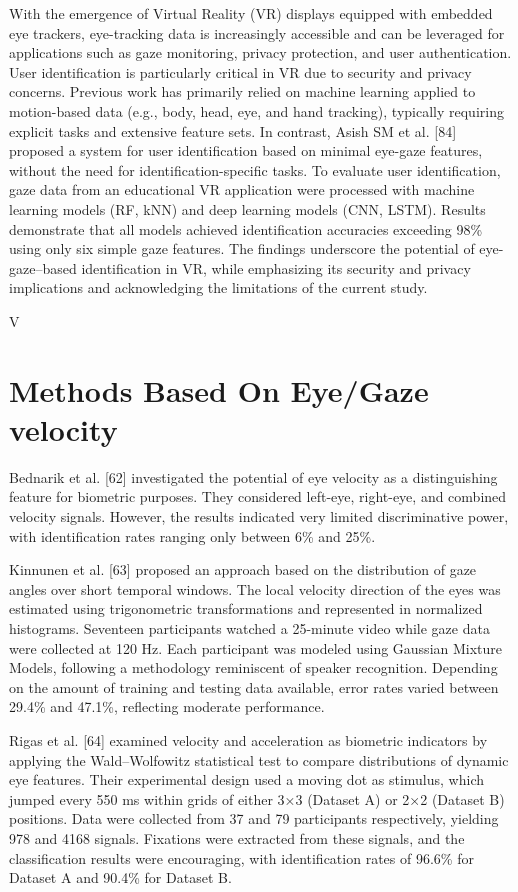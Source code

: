 \documentclass[12pt]{report}
\begin{document}
With the emergence of Virtual Reality (VR) displays equipped with embedded eye trackers, eye-tracking data is increasingly accessible and can be leveraged for applications such as gaze monitoring, privacy protection, and user authentication.
User identification is particularly critical in VR due to security and privacy concerns. 
Previous work has primarily relied on machine learning applied to motion-based data (e.g., body, head, eye, and hand tracking), typically requiring explicit tasks and extensive feature sets. 
In contrast, Asish SM et al. [84] proposed a system for user identification based on minimal eye-gaze features, without the need for identification-specific tasks. 
To evaluate user identification, gaze data from an educational VR application were processed with machine learning models (RF, kNN) and deep learning models (CNN, LSTM).
Results demonstrate that all models achieved identification accuracies exceeding 98\% using only six simple gaze features. 
The findings underscore the potential of eye-gaze–based identification in VR, while emphasizing its security and privacy implications and acknowledging the limitations of the current study.

V\section{Methods Based On Eye/Gaze velocity}

Bednarik et al. [62] investigated the potential of eye velocity as a distinguishing feature for biometric purposes.
They considered left-eye, right-eye, and combined velocity signals.
However, the results indicated very limited discriminative power, with identification rates ranging only between 6\% and 25\%.

Kinnunen et al. [63] proposed an approach based on the distribution of gaze angles over short temporal windows. 
The local velocity direction of the eyes was estimated using trigonometric transformations and represented in normalized histograms. 
Seventeen participants watched a 25-minute video while gaze data were collected at 120 Hz. 
Each participant was modeled using Gaussian Mixture Models, following a methodology reminiscent of speaker recognition. 
Depending on the amount of training and testing data available, error rates varied between 29.4\% and 47.1\%, reflecting moderate performance.

Rigas et al. [64] examined velocity and acceleration as biometric indicators by applying the Wald–Wolfowitz statistical test to compare distributions of dynamic eye features.
Their experimental design used a moving dot as stimulus, which jumped every 550 ms within grids of either 3×3 (Dataset A) or 2×2 (Dataset B) positions. 
Data were collected from 37 and 79 participants respectively, yielding 978 and 4168 signals. 
Fixations were extracted from these signals, and the classification results were encouraging, with identification rates of 96.6\% for Dataset A and 90.4\% for Dataset B.
\end{document}
